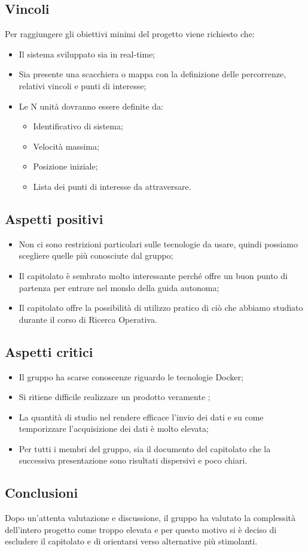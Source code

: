 \subsection{Vincoli}
Per raggiungere gli obiettivi minimi del progetto viene richiesto che:
\begin{itemize}
\item Il sistema sviluppato sia in real-time;
\item Sia presente una scacchiera o mappa con la definizione delle percorrenze, relativi vincoli e punti di interesse;
\item Le N unità dovranno essere definite da:
	\begin{itemize}
	\item Identificativo di sistema;
	\item Velocità massima;
	\item Posizione iniziale;
	\item Lista dei punti di interesse da attraversare.
	\end{itemize}
\end{itemize}

\subsection{Aspetti positivi}
\begin{itemize}
	\item Non ci sono restrizioni particolari sulle tecnologie da usare, quindi possiamo scegliere quelle più conosciute dal gruppo;
	\item Il capitolato è sembrato molto interessante perché offre un buon punto di partenza per entrare nel mondo della guida autonoma;
	\item Il capitolato offre la possibilità di utilizzo pratico di ciò che abbiamo studiato durante il corso di Ricerca Operativa.
\end{itemize}

\subsection{Aspetti critici}
\begin{itemize}
	\item Il gruppo ha scarse conoscenze riguardo le tecnologie Docker;
	\item Si ritiene difficile realizzare un prodotto veramente ;
	\item La quantità di studio nel rendere efficace l'invio dei dati e su come temporizzare l'acquisizione dei dati è molto elevata;
	\item Per tutti i membri del gruppo, sia il documento del capitolato che la successiva presentazione sono risultati dispersivi e poco chiari.
\end{itemize}

\subsection{Conclusioni}
Dopo un'attenta valutazione e discussione, il gruppo ha valutato la complessità dell'intero progetto come troppo elevata e per questo motivo si è deciso di escludere il capitolato e di orientarsi verso alternative più stimolanti.
